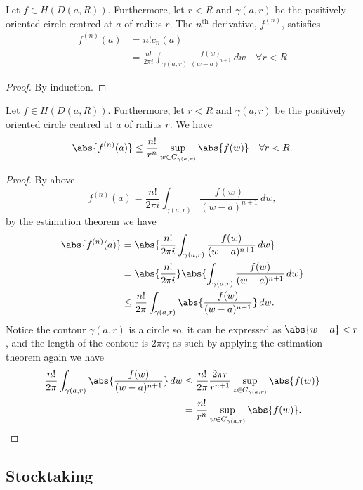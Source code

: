 \documentclass[12pt, a4paper]{article}
\begin{document}
\begin{mdcor}
    Let \(f \in H(D(a,R))\). Furthermore, let \(r<R\) and \(\gamma(a,r)\) be the positively oriented circle centred at \(a\) of radius \(r\). The \(n^{\text{th}}\) derivative, \(f^{(n)}\), satisfies 
    \[\begin{aligned}
        f^{(n)}(a) &= n! c_n(a) \\
        &= \frac{n!}{2\pi i} \int_{\gamma(a,r)} \frac{f(w)}{(w-a)^{n+1}} \, dw \quad \forall r<R
    \end{aligned}\]
\end{mdcor}

\begin{proof}
    By induction.
\end{proof}

\begin{mdcor}
    Let \(f \in H(D(a,R))\). Furthermore, let \(r<R\) and \(\gamma(a,r)\) be the positively oriented circle centred at \(a\) of radius \(r\). We have 
    \[\abs{f^{(n)}(a)} \leq \frac{n!}{r^n} \sup_{w \in C_{\gamma(a,r)}}\abs{f(w)} \quad \forall r <R.\]
\end{mdcor}

\begin{proof}
    By above 
    \[f^{(n)}(a) =\frac{n!}{2\pi i} \int_{\gamma(a,r)} \frac{f(w)}{(w-a)^{n+1}} \, dw,\]
    by the estimation theorem we have 
    \[\begin{aligned}
        \abs{f^{(n)}(a)} &= \abs{\frac{n!}{2\pi i} \int_{\gamma(a,r)} \frac{f(w)}{(w-a)^{n+1}} \, dw} \\
        &= \abs{\frac{n!}{2\pi i}} \abs{\int_{\gamma(a,r)} \frac{f(w)}{(w-a)^{n+1}} \, dw} \\
        &\leq \frac{n!}{2\pi} \int_{\gamma(a,r)} \abs{\frac{f(w)}{(w-a)^{n+1}}} \, dw.
    \end{aligned}\]
    Notice the contour \(\gamma(a,r)\) is a circle so, it can be expressed as \(\abs{w-a}<r\), and the length of the contour is \(2\pi r\); as such by applying the estimation theorem again we have 
    \[\begin{aligned}
        \frac{n!}{2\pi} \int_{\gamma(a,r)} \abs{\frac{f(w)}{(w-a)^{n+1}}} \, dw &\leq \frac{n!}{2\pi} \frac{2\pi r}{r^{n+1}}\sup_{z \in C_{\gamma(a,r)}} \abs{f(w)} \\
        &= \frac{n!}{r^n} \sup_{w \in C_{\gamma(a,r)}}\abs{f(w)}.
    \end{aligned}\]
\end{proof}

\subsection{Stocktaking}
\end{document}
